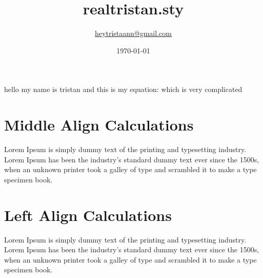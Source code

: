\documentclass{article}
\title{realtristan.sty}
\author{\href{mailto:heytristaann@gmail.com}{heytristaann@gmail.com}}
\date{\today}
\begin{document}
\maketitle


\noindent hello  my name is tristan and this is my equation:  which is very complicated

\section{Middle Align Calculations} {
  Lorem Ipsum is simply dummy text of the printing and typesetting industry. Lorem Ipsum has been the industry's standard dummy text ever since the 1500s, when an unknown printer took a galley of type and scrambled it to make a type specimen book.
 }

\section{Left Align Calculations} {
  Lorem Ipsum is simply dummy text of the printing and typesetting industry. Lorem Ipsum has been the industry's standard dummy text ever since the 1500s, when an unknown printer took a galley of type and scrambled it to make a type specimen book.
 }
\end{document}
